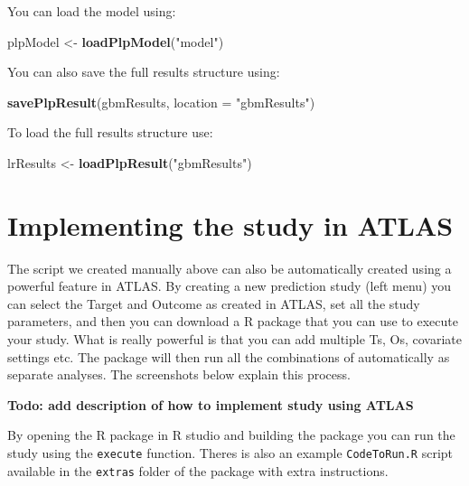 \documentclass[]{book}
\newenvironment{Shaded}{\begin{snugshade}}{\end{snugshade}}
\newcommand{\KeywordTok}[1]{\textcolor[rgb]{0.13,0.29,0.53}{\textbf{#1}}}
\newcommand{\DataTypeTok}[1]{\textcolor[rgb]{0.13,0.29,0.53}{#1}}
\newcommand{\StringTok}[1]{\textcolor[rgb]{0.31,0.60,0.02}{#1}}
\newcommand{\NormalTok}[1]{#1}
\begin{document}
You can load the model using:

\begin{Shaded}
\begin{Highlighting}[]
\NormalTok{plpModel <-}\StringTok{ }\KeywordTok{loadPlpModel}\NormalTok{(}\StringTok{"model"}\NormalTok{)}
\end{Highlighting}
\end{Shaded}

You can also save the full results structure using:

\begin{Shaded}
\begin{Highlighting}[]
\KeywordTok{savePlpResult}\NormalTok{(gbmResults, }\DataTypeTok{location =} \StringTok{"gbmResults"}\NormalTok{)}
\end{Highlighting}
\end{Shaded}

To load the full results structure use:

\begin{Shaded}
\begin{Highlighting}[]
\NormalTok{lrResults <-}\StringTok{ }\KeywordTok{loadPlpResult}\NormalTok{(}\StringTok{"gbmResults"}\NormalTok{)}
\end{Highlighting}
\end{Shaded}

\section{Implementing the study in
ATLAS}\label{implementing-the-study-in-atlas}

The script we created manually above can also be automatically created
using a powerful feature in ATLAS. By creating a new prediction study
(left menu) you can select the Target and Outcome as created in ATLAS,
set all the study parameters, and then you can download a R package that
you can use to execute your study. What is really powerful is that you
can add multiple Ts, Os, covariate settings etc. The package will then
run all the combinations of automatically as separate analyses. The
screenshots below explain this process.

\textbf{Todo: add description of how to implement study using ATLAS}

By opening the R package in R studio and building the package you can
run the study using the \texttt{execute} function. Theres is also an
example \texttt{CodeToRun.R} script available in the \texttt{extras}
folder of the package with extra instructions.
\end{document}
